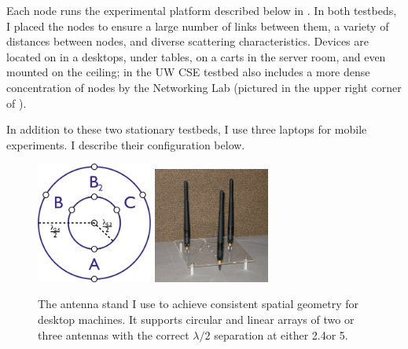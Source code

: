Each node runs the experimental platform described below in . In both testbeds, I placed the nodes to ensure a large number of links between them, a variety of distances between nodes, and diverse scattering characteristics. Devices are located on in a desktops, under tables, on a carts in the server room, and even mounted on the ceiling; in the UW CSE testbed also includes a more dense concentration of nodes by the Networking Lab (pictured in the upper right corner of ).

In addition to these two stationary testbeds, I use three laptops for mobile experiments. I describe their configuration below.

\begin{figure}[ht]
	\centering
	\includegraphics[width=1.5in]{figures/rpsma_dual_632_single_lines.pdf}%
	\hspace{1in}
	\includegraphics[height=1.5in,width=1.5in]{figures/antennas.jpg}
	\caption[A custom antenna stand used to achieve consistent spatial geometry]{\label{fig:antenna_stand}The antenna stand I use to achieve consistent spatial geometry for desktop machines. It supports circular and linear arrays of two or three antennas with the correct $\lambda/2$ separation at either 2.4\GHz or 5\GHz.}
\end{figure}
